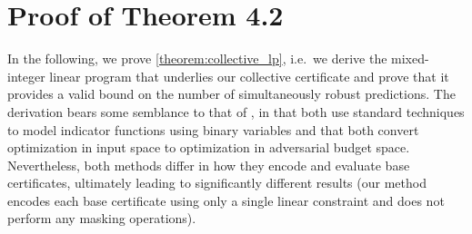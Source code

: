 \section{Proof of Theorem 4.2}\label{section:proof_lp}
In the following, we prove \autoref{theorem:collective_lp}, i.e.~we derive the mixed-integer linear program that underlies our collective certificate and prove that it provides a valid bound on the number of simultaneously robust predictions.
The derivation bears some semblance to that of \citep{Schuchardt2021}, in that both use standard techniques to model indicator functions using binary variables and that both convert optimization in input space to optimization in adversarial budget space.
Nevertheless, both methods differ in how they encode and evaluate base certificates, ultimately leading to significantly different results (our method encodes each base certificate using only a single linear constraint and does not perform any  masking operations).


